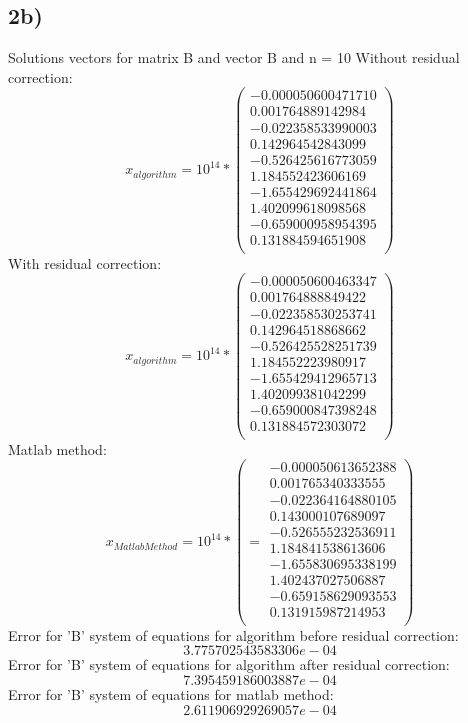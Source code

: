 \documentclass[12pt]{report}
\begin{document}
\subsection{2b)}
Solutions vectors for matrix B and vector B and n = 10
Without residual correction:
\[ x_{algorithm} = 10^{14} * \left(\begin{array}{cc}
-0.000050600471710 \\
 0.001764889142984 \\
-0.022358533990003 \\
 0.142964542843099 \\
-0.526425616773059 \\
 1.184552423606169 \\
-1.655429692441864 \\
 1.402099618098568 \\
-0.659000958954395 \\
 0.131884594651908 \\
\end{array} \right)
\]
With residual correction:
\[ x_{algorithm} = 10^{14} * \left(\begin{array}{cc}
-0.000050600463347 \\
 0.001764888849422 \\
-0.022358530253741 \\
 0.142964518868662 \\
-0.526425528251739 \\
 1.184552223980917 \\
-1.655429412965713 \\
 1.402099381042299 \\
-0.659000847398248 \\
 0.131884572303072 \\
\end{array} \right)
\]
Matlab method:
\[
x_{Matlab Method} = 10^{14} * \left(  = \begin{array}{cc}
-0.000050613652388 \\
0.001765340333555 \\
-0.022364164880105 \\
0.143000107689097 \\
-0.526555232536911 \\
1.184841538613606 \\
-1.655830695338199 \\
1.402437027506887 \\
-0.659158629093553 \\
0.131915987214953 \\
\end{array} \right)
\]
Error for 'B' system of equations for algorithm before residual correction: \[ 3.775702543583306e-04 \]
Error for 'B' system of equations for algorithm after residual correction: \[ 7.395459186003887e-04 \]
Error for 'B' system of equations for matlab method: \[ 2.611906929269057e-04 \]
\end{document}
